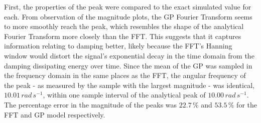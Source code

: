 \documentclass[12pt]{article}
\begin{document}

    First, the properties of the peak were compared to the exact simulated value for each.
    From observation of the magnitude plots, the GP Fourier Transform seems to more smoothly reach the peak, which resembles the shape of the analytical Fourier Transform more closely than the FFT.
    This suggests that it captures information relating to damping better, likely because the FFT's Hanning window would distort the signal's exponential decay in the time domain from the damping dissipating energy over time.
    Since the mean of the GP was sampled in the frequency domain in the same places as the FFT, the angular frequency of the peak - as measured by the sample with the largest magnitude - was identical, $10.01 \, rad \, s^{-1}$, within one sample interval of the analytical peak of $10.00 \, rad \, s^{-1}$.
    The percentage error in the magnitude of the peaks was $22.7 \, \%$ and $53.5 \, \%$ for the FFT and GP model respectively.
\end{document}
